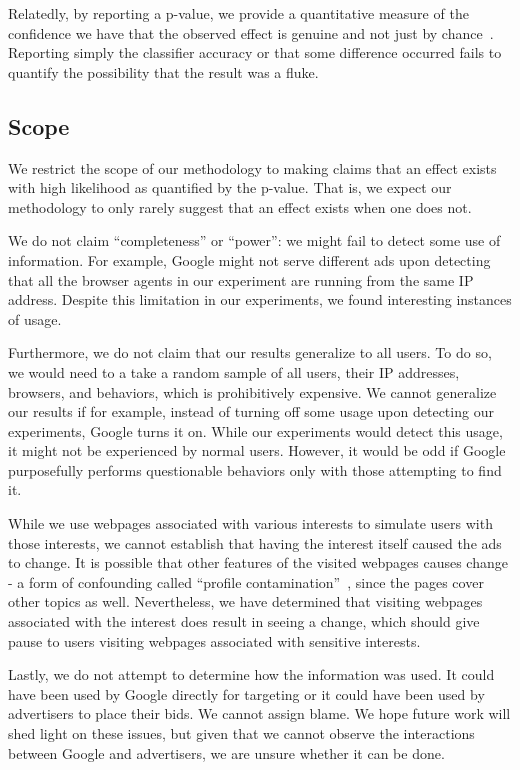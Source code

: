 \documentclass{article}
\begin{document}
Relatedly, by reporting a p-value, we provide a quantitative measure of the confidence we have that the observed effect is genuine and not just by chance~\cite{jensen92phd}.
Reporting simply the classifier accuracy or that some difference occurred fails to quantify the possibility that the result was a fluke.



\subsection{Scope}
\label{sec:scope}

We restrict the scope of our methodology to making claims that an effect exists with high likelihood as quantified by the p-value.
That is, we expect our methodology to only rarely suggest that an effect exists when one does not. 


We do not claim ``completeness'' or ``power'': we might fail to detect some use of information.  For example, Google might not serve different ads upon detecting that all the browser agents in our experiment are running from the same IP address.  Despite this limitation in our experiments, we found interesting instances of usage. 

Furthermore, we do not claim that our results generalize to all users.  To do so, we would need to a take a random sample of all users, their IP addresses, browsers, and behaviors, which is prohibitively expensive. We cannot generalize our results if for example, instead of turning off some usage upon detecting our experiments, Google  turns it on. While our experiments would detect this usage, it might not be experienced by normal users.  However, it would be odd if Google purposefully performs questionable behaviors only with those attempting to find it.

While we use webpages associated with various interests to simulate users with those interests, we cannot establish that having the interest itself caused the ads to change.  It is possible that other features of the visited webpages causes change - a form of confounding called ``profile contamination''~\cite{barford14www}, since the pages cover other topics as well.  Nevertheless, we have determined that visiting webpages associated with the interest does result in seeing a change, which should give pause to users visiting webpages associated with sensitive interests.

Lastly, we do not attempt to determine how the information was used.  It could have been used by Google directly for targeting or it could have been used by advertisers to place their bids.  We cannot assign blame.  We hope future work will shed light on these issues, but given that we cannot observe the interactions between Google and advertisers, we are unsure whether it can be done.
\end{document}

